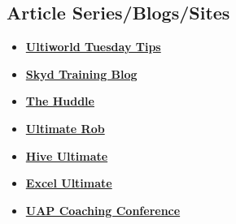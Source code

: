 \subsection*{Article Series/Blogs/Sites}
\begin{itemize}
    \item \textcolor{blue}{\textbf{\href{https://ultiworld.com/tag/tuesday-tips/}{Ultiworld Tuesday Tips}}}
    \item \textcolor{blue}{\textbf{\href{https://skydmagazine.com/column/training-blog/}{Skyd Training Blog}}}
    \item \textcolor{blue}{\textbf{\href{https://www.usaultimate.org/multimedia/the_huddle/issues.aspx}{The Huddle}}}
    \item \textcolor{blue}{\textbf{\href{https://ultimaterob.com}{Ultimate Rob}}}
    \item \textcolor{blue}{\textbf{\href{https://hiveultimate.com}{Hive Ultimate}}}
    \item \textcolor{blue}{\textbf{\href{https://excelultimate.com/}{Excel Ultimate}}}
    \item \textcolor{blue}{\textbf{\href{https://docs.google.com/document/d/1y6dZd_O58VfnWWycj11Te31lJWBj0Gh2JhEeIYl4SK8/edit?usp=sharing}{UAP Coaching Conference}}}
\end{itemize}
